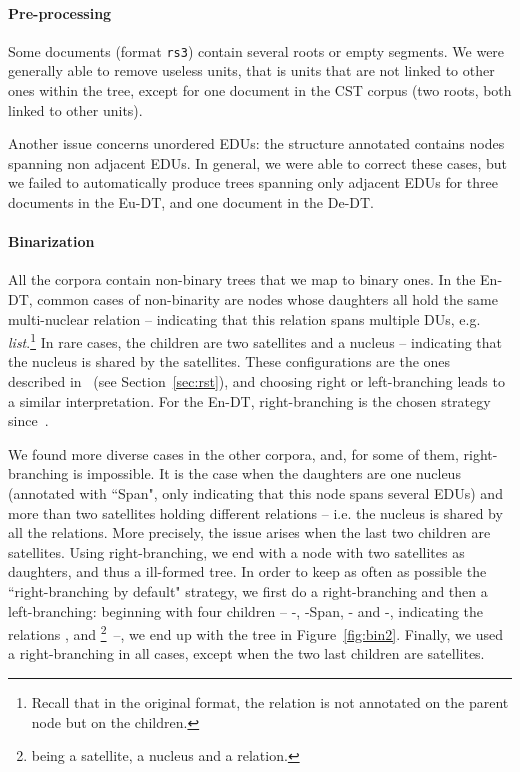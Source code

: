 \documentclass[11pt]{article}
\newcommand{\erstdt}{En-DT}
\newcommand{\derst}{De-DT}
\newcommand{\barst}{Eu-DT}
\newcommand{\rel}[1]{\textit{#1}}
\begin{document}
\paragraph{Pre-processing} Some documents (format \texttt{rs3}) contain several roots or empty segments. 
We were generally able to remove useless units, that is units that are not linked to other ones within the tree, except for one document in the CST corpus (two roots, both linked to other units). 

Another issue concerns unordered EDUs: the structure annotated contains nodes spanning non adjacent EDUs. 
In general, we were able to correct these cases, but we failed to automatically produce trees spanning only adjacent EDUs for three documents in the \barst, and one document in the \derst.



\paragraph{Binarization} All the corpora contain non-binary trees that we map to binary ones.
In the \erstdt, common cases of non-binarity are nodes whose daughters all hold  the same multi-nuclear relation  -- indicating that this relation spans multiple DUs, e.g. \rel{list}.\footnote{Recall that in the original format, the relation is not annotated on the parent node but on the children.}
In rare cases, the children are two satellites and a nucleus -- indicating that the nucleus is shared by the satellites. 
These configurations are the ones described in~\cite{marcu:discourse:1997} (see Section~\ref{sec:rst}), and choosing right or left-branching leads to a similar interpretation.
For the \erstdt, right-branching is the chosen strategy since~\cite{soricut:sentence:2003}.

We found more diverse cases in the other corpora, and, for some of them, right-branching is impossible. 
It is the case when the daughters are one nucleus (annotated with ``Span", only indicating that this node spans several EDUs) and more than two satellites holding different relations -- i.e. the nucleus is shared by all the relations. 
More precisely, the issue arises when the last two children are satellites.
Using right-branching, we end with a node with two satellites as daughters, and thus a ill-formed tree.
In order to keep as often as possible the ``right-branching by default" strategy, we first do a right-branching and then a left-branching: beginning with four children -- -, -Span, - and -, indicating the relations ,  and \footnote{ being a satellite,  a nucleus and  a relation.}~--, we end up with the tree in Figure~\ref{fig:bin2}. 
Finally, we used a right-branching in all cases, except when the two last children are satellites.
\end{document}
